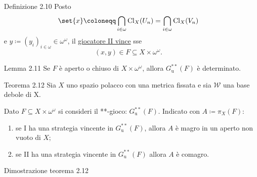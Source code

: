 \documentclass[babel]{beamer}
\renewcommand{\href}[2]{#2}
\begin{document}
\begin{frame}[label={sec:org5b7f218}]
\begin{block}{Definizione 2.10}
Posto
\begin{equation*}
\set{x}\coloneqq\bigcap_{i \in \omega} \operatorname{Cl}_{X}(U_{n}) = \bigcap_{i \in \omega} \operatorname{Cl}_{X}(V_{n})
\end{equation*}
e \(y\coloneqq (y_{i})_{i \in \omega} \in \omega^{\omega}\), il \uline{giocatore II vince} sse
\begin{equation*}
(x,y) \in F \subseteq X\times \omega^{\omega}.
\end{equation*}
\end{block}
\begin{alertblock}{Lemma 2.11}
Se \(F\) è aperto o chiuso di \(X\times\omega^{\omega}\), allora \(G^{**}_{\text{u}}(F)\) è determinato.
\end{alertblock}
\end{frame}
\begin{frame}[label={sec:org857017c}]
\begin{alertblock}{Teorema 2.12}
Sia \(X\) uno spazio polacco con una metrica fissata e sia \(\mathcal{W}\) una base debole di X.

Dato \(F \subseteq X\times \omega^{\omega}\) si consideri il \href{../../../../../../../org/roam/20250513111844-gioco_di_banach_mazur.org}{**-gioco}: \(G^{**}_{\text{u}}(F)\). Indicato con \(A\coloneqq \pi_{X}(F)\):
\begin{enumerate}
\item se I ha una \href{../../../../../../../org/roam/20250513171520-giochi_di_gale_stewart.org}{strategia} \href{../../../../../../../org/roam/20250513171520-giochi_di_gale_stewart.org}{vincente} in \(G^{**}_{\text{u}}(F)\), allora \(A\) è magro in un aperto non vuoto di \(X\);
\item se II ha una \href{../../../../../../../org/roam/20250513171520-giochi_di_gale_stewart.org}{strategia} \href{../../../../../../../org/roam/20250513171520-giochi_di_gale_stewart.org}{vincente} in \(G^{**}_{\text{u}}(F)\) allora \(A\) è comagro.
\end{enumerate}
\end{alertblock}
\end{frame}
\begin{frame}[label={sec:org223aa91}]
Dimostrazione teorema 2.12
\end{frame}
\end{document}

